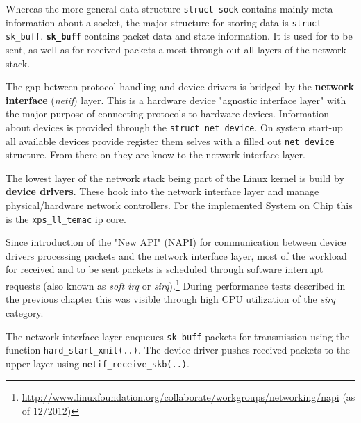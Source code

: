 Whereas the more general data structure \texttt{struct sock} contains mainly meta information about a socket, the major structure for storing data is \texttt{struct sk\_buff}. \textbf{\texttt{sk\_buff}} contains packet data and state information. It is used for to be sent, as well as for received packets almost through out all layers of the network stack. \cite{netstackana}

The gap between protocol handling and device drivers is bridged by the \textbf{network interface} (\textit{netif}) layer. This is a hardware device "agnostic interface layer" \cite{netstackana} with the major purpose of connecting protocols to hardware devices. Information about devices is provided through the \texttt{struct net\_device}. On system start-up all available devices provide register them selves with a filled out \texttt{net\_device} structure. From there on they are know to the network interface layer.

The lowest layer of the network stack being part of the Linux kernel is build by \textbf{device drivers}. These hook into the network interface layer and manage physical/hardware network controllers. For the implemented System on Chip this is the \texttt{xps\_ll\_temac} \gls{ip} core.

Since introduction of the "New API" (NAPI) for communication between device drivers processing packets and the network interface layer, most of the workload for received and to be sent packets is scheduled through software interrupt requests (also known as \textit{soft irq} or \textit{sirq}).\footnote{\url{http://www.linuxfoundation.org/collaborate/workgroups/networking/napi} (as of 12/2012)} During performance tests described in the previous chapter this was visible through high CPU utilization of the \textit{sirq} category.

The network interface layer enqueues \texttt{sk\_buff} packets for transmission using the function \texttt{hard\_start\_xmit(..)}. The device driver pushes received packets to the upper layer using \texttt{netif\_receive\_skb(..)}. \cite{netstackana}